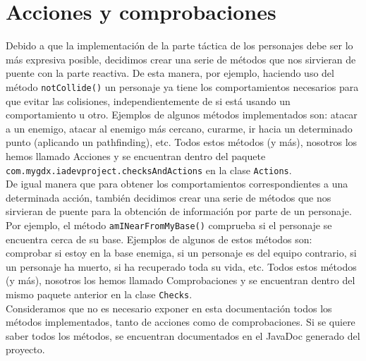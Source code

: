 \medskip
\section{Acciones y comprobaciones}
Debido a que la implementación de la parte táctica de los personajes debe ser lo más expresiva posible, decidimos crear una serie de métodos que nos sirvieran de puente con la parte reactiva. De esta manera, por ejemplo, haciendo uso del método \texttt{notCollide()} un personaje ya tiene los comportamientos necesarios para que evitar las colisiones, independientemente de si está usando un comportamiento u otro. Ejemplos de algunos métodos implementados son: atacar a un enemigo, atacar al enemigo más cercano, curarme, ir hacia un determinado punto (aplicando un pathfinding), etc. Todos estos métodos (y más), nosotros los hemos llamado Acciones y se encuentran dentro del paquete \texttt{com.mygdx.iadevproject.checksAndActions} en la clase \texttt{Actions}. \\

De igual manera que para obtener los comportamientos correspondientes a una determinada acción, también decidimos crear una serie de métodos que nos sirvieran de puente para la obtención de información por parte de un personaje. Por ejemplo, el método \texttt{amINearFromMyBase()}
comprueba si el personaje se encuentra cerca de su base. Ejemplos de algunos de estos métodos son: comprobar si estoy en la base enemiga, si un personaje es del equipo contrario, si un personaje ha muerto, si ha recuperado toda su vida, etc. Todos estos métodos (y más), nosotros los hemos llamado Comprobaciones y se encuentran dentro del mismo paquete anterior en la clase \texttt{Checks}. \\

Consideramos que no es necesario exponer en esta documentación todos los métodos implementados, tanto de acciones como de comprobaciones. Si se quiere saber todos los métodos, se encuentran documentados en el JavaDoc generado del proyecto.



